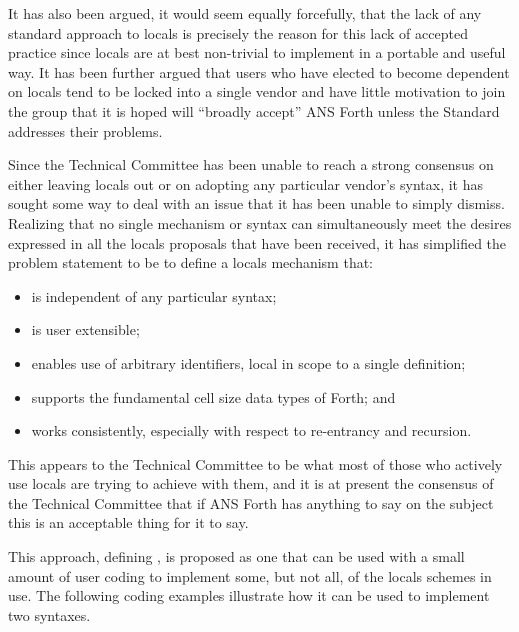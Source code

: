 It has also been argued, it would seem equally forcefully, that the
lack of any standard approach to locals is precisely the reason for
this lack of accepted practice since locals are at best non-trivial
to implement in a portable and useful way. It has been further argued
that users who have elected to become dependent on locals tend to be
locked into a single vendor and have little motivation to join the
group that it is hoped will ``broadly accept'' ANS Forth unless the
Standard addresses their problems.

Since the Technical Committee has been unable to reach a strong
consensus on either leaving locals out or on adopting any particular
vendor's syntax, it has sought some way to deal with an issue that it
has been unable to simply dismiss. Realizing that no single mechanism
or syntax can simultaneously meet the desires expressed in all the
locals proposals that have been received, it has simplified the
problem statement to be to define a locals mechanism that:

\begin{itemize}
\item is independent of any particular syntax;
\item is user extensible;
\item enables use of arbitrary identifiers,
	local in scope to a single definition;
\item supports the fundamental cell size data types of Forth;
	and
\item works consistently, especially with respect to
	re-entrancy and recursion.
\end{itemize}

This appears to the Technical Committee to be what most of those who
actively use locals are trying to achieve with them, and it is at
present the consensus of the Technical Committee that if ANS Forth has
anything to say on the subject this is an acceptable thing for it to
say.

This approach, defining , is proposed as one that can be
used with a small amount of user coding to implement some, but not all,
of the locals schemes in use. The following coding examples illustrate
how it can be used to implement two syntaxes.

